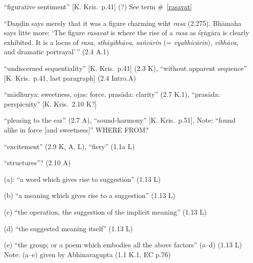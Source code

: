 \documentclass[10pt]{article}
\begin{document}
\begin{multicols}{2}
\begin{enumerate}
		 ``figurative sentiment'' [K. Kris.\ p.41] (?)
		See term \#~\ref{rasavat}

		 ``Daṇḍin says merely that it was a figure charming wiht \textit{rasa} (2.275).
		Bhāmaha says litte more: `The figure \textit{rasavat} is where the rise of a \textit{rasa} as śṛṅgāra is clearly exhibited. It is a locus of \textit{rasa}, \textit{sthāyibhāva}, \textit{sañcārin} (= \textit{vyabhicārin}), \textit{vibhāva}, and dramatic portrayal'\,'' (2.4 A.1)

		 ``undiscerned sequentiality'' [K. Kris.\ p.41] (2.3 K), ``without apparent sequence'' [K. Kris.\ p.41, last paragraph] (2.4 Intro.A)

		 ``mādhurya: sweetness, ojas: force, prasāda: clarity'' (2.7 K.1), ``prasāda: perspicuity'' [K. Kris.\ 2.10 K?]

		 ``pleasing to the ear'' (2.7 A), ``sound-harmony'' [K. Kris.\ p.51], Note: ``found alike in force [and sweetness]'' WHERE FROM?

		 ``excitement'' (2.9 K, A, L), ``fiery'' (1.1a L)

		 ``structures''? (2.10 A)



		 (a): ``a word which gives rise to suggestion'' (1.13 L)

		 (b) ``a meaning which gives rise to a suggestion'' (1.13 L)

		 (c) ``the operation, the suggestion of the implicit meaning'' (1.13 L)

		 (d) ``the suggested meaning itself'' (1.13 L)

		 (e) ``the group; or a poem which embodies all the above factors'' (a--d) (1.13 L) Note: (a--e) given by Abhinavagupta (1.1 K.1, EC p.76)


\end{enumerate}
\end{multicols}
\end{document}
